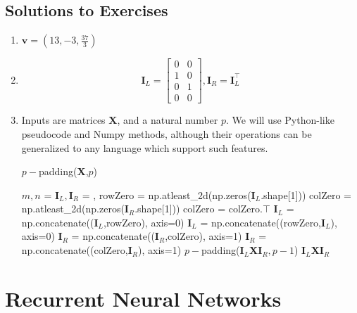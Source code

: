 \section{Solutions to Exercises}
\begin{enumerate}
    \item $\textbf{v} = (13,-3,\frac{37}{3})$
            
    \item $$\textbf{I}_L = \begin{bmatrix}
        0 & 0 \\ 1 & 0 \\ 0 & 1 \\ 0 & 0
    \end{bmatrix}, \textbf{I}_R = \textbf{I}_L^{\top}$$
    
    \item Inputs are matrices $\textbf{X}$, and a natural number $p$. We will use Python-like pseudocode and Numpy methods, although their operations can be generalized to any language which support such features.
    \begin{algorithm}
    \caption{$p-$padding(\textbf{X},$p$)}
    \begin{algorithmic}[1]
        \State $m,n$ = 
        \State $\textbf{I}_L, \textbf{I}_R$ = ,\;
        \State rowZero = np.atleast\_2d(np.zeros($\textbf{I}_L$.shape[1]))
        \State colZero = np.atleast\_2d(np.zeros($\textbf{I}_R$.shape[1]))
        \State colZero = colZero.$\top$
        \State $\textbf{I}_L$ = np.concatenate(($\textbf{I}_L$,rowZero), axis=0)
        \State $\textbf{I}_L$ = np.concatenate((rowZero,$\textbf{I}_L$), axis=0)
        \State $\textbf{I}_R$ = np.concatenate(($\textbf{I}_R$,colZero), axis=1)
        \State $\textbf{I}_R$ = np.concatenate((colZero,$\textbf{I}_R$), axis=1)
		\State \Return $p-$padding($\textbf{I}_L\textbf{X}\textbf{I}_R, p-1$)
		\EndIf
        \State \Return $\textbf{I}_L\textbf{X}\textbf{I}_R$
	\end{algorithmic} 
\end{algorithm}
\end{enumerate}










\chapter{Recurrent Neural Networks}

